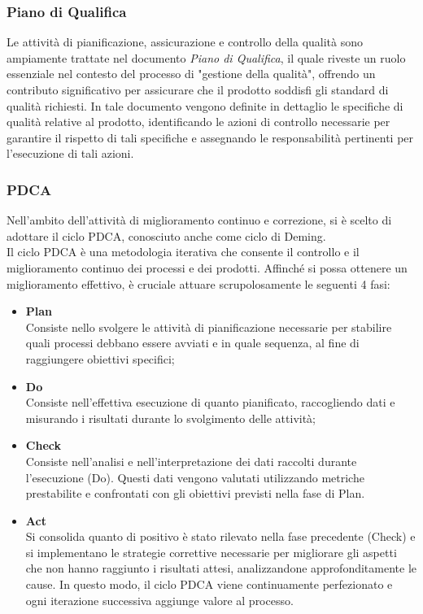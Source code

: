 \subsubsection{Piano di Qualifica}

Le attività di pianificazione, assicurazione e controllo della qualità sono ampiamente trattate nel documento \textit{Piano di Qualifica}, il quale riveste un ruolo essenziale nel contesto del processo di "gestione della qualità", offrendo un contributo significativo per assicurare che il prodotto soddisfi gli standard di qualità richiesti. In tale documento vengono definite in dettaglio le specifiche di qualità relative al prodotto, identificando le azioni di controllo necessarie per garantire il rispetto di tali specifiche e assegnando le responsabilità pertinenti per l'esecuzione di tali azioni.

\subsubsection{PDCA}
Nell'ambito dell'attività di miglioramento continuo e correzione, si è scelto di adottare il ciclo PDCA, conosciuto anche come ciclo di Deming. \\
Il ciclo PDCA è una metodologia iterativa che consente il controllo e il miglioramento continuo dei processi e dei prodotti. Affinché si possa ottenere un miglioramento effettivo, è cruciale attuare scrupolosamente le seguenti 4 fasi:

\begin{itemize}
    \item \textbf{Plan} \\
    Consiste nello svolgere le attività di pianificazione necessarie per stabilire quali processi debbano essere avviati e in quale sequenza, al fine di raggiungere obiettivi specifici;
    \item \textbf{Do} \\
    Consiste nell'effettiva esecuzione di quanto pianificato, raccogliendo dati e misurando i risultati durante lo svolgimento delle attività;
    \item \textbf{Check} \\
    Consiste nell'analisi e nell'interpretazione dei dati raccolti durante l'esecuzione (Do). Questi dati vengono valutati utilizzando metriche prestabilite e confrontati con gli obiettivi previsti nella fase di Plan.
    \item \textbf{Act} \\
    Si consolida quanto di positivo è stato rilevato nella fase precedente (Check) e si implementano le strategie correttive necessarie per migliorare gli aspetti che non hanno raggiunto i risultati attesi, analizzandone approfonditamente le cause. In questo modo, il ciclo PDCA viene continuamente perfezionato e ogni iterazione successiva aggiunge valore al processo.
\end{itemize}

